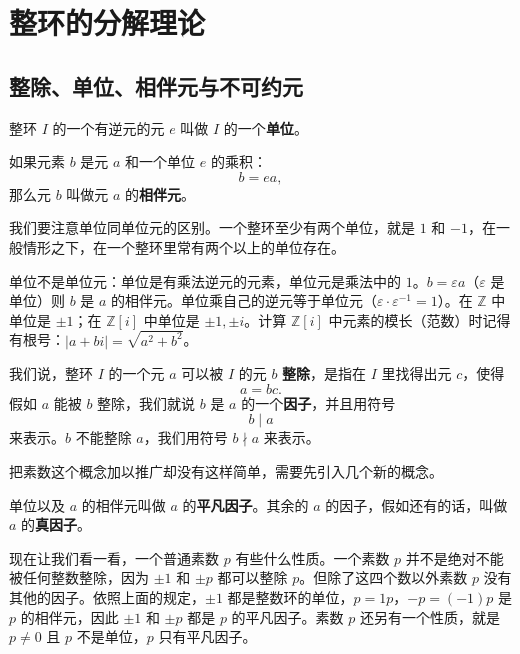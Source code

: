 \chapter{整环的分解理论}

\section{整除、单位、相伴元与不可约元}

\begin{definition}[单位与相伴元]
整环 $I$ 的一个有逆元的元 $e$ 叫做 $I$ 的一个\textbf{单位}。

如果元素 $b$ 是元 $a$ 和一个单位 $e$ 的乘积：
\[
b=ea,
\]
那么元 $b$ 叫做元 $a$ 的\textbf{相伴元}。

我们要注意单位同单位元的区别。一个整环至少有两个单位，就是 $1$ 和 $-1$，在一般情形之下，在一个整环里常有两个以上的单位存在。
\end{definition}

\begin{note}[单位与相伴元辨析]
单位不是单位元：单位是有乘法逆元的元素，单位元是乘法中的 $1$。$b = \varepsilon a$（$\varepsilon$ 是单位）则 $b$ 是 $a$ 的相伴元。单位乘自己的逆元等于单位元（$\varepsilon\cdot\varepsilon^{-1}=1$）。在 $\mathbb{Z}$ 中单位是 $\pm1$；在 $\mathbb{Z}[i]$ 中单位是 $\pm1,\pm i$。计算 $\mathbb{Z}[i]$ 中元素的模长（范数）时记得有根号：$|a+bi|=\sqrt{a^2+b^2}$。
\end{note}

\begin{definition}[整除与因子]
我们说，整环 $I$ 的一个元 $a$ 可以被 $I$ 的元 $b$ \textbf{整除}，是指在 $I$ 里找得出元 $c$，使得
\[
a=bc.
\]
假如 $a$ 能被 $b$ 整除，我们就说 $b$ 是 $a$ 的一个\textbf{因子}，并且用符号
\[
b\mid a
\]
来表示。$b$ 不能整除 $a$，我们用符号 $b\nmid a$ 来表示。

把素数这个概念加以推广却没有这样简单，需要先引入几个新的概念。
\end{definition}

\begin{definition}[平凡因子与真因子]
单位以及 $a$ 的相伴元叫做 $a$ 的\textbf{平凡因子}。其余的 $a$ 的因子，假如还有的话，叫做 $a$ 的\textbf{真因子}。

现在让我们看一看，一个普通素数 $p$ 有些什么性质。一个素数 $p$ 并不是绝对不能被任何整数整除，因为 $\pm1$ 和 $\pm p$ 都可以整除 $p$。但除了这四个数以外素数 $p$ 没有其他的因子。依照上面的规定，$\pm1$ 都是整数环的单位，$p=1p$，$-p=(-1)p$ 是 $p$ 的相伴元，因此 $\pm1$ 和 $\pm p$ 都是 $p$ 的平凡因子。素数 $p$ 还另有一个性质，就是 $p\ne0$ 且 $p$ 不是单位，$p$ 只有平凡因子。
\end{definition}

